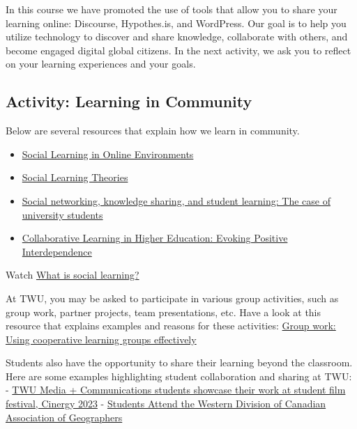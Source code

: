 \documentclass[
]{book}
\providecommand{\tightlist}{%
  \setlength{\itemsep}{0pt}\setlength{\parskip}{0pt}}
\theoremstyle{definition}
\theoremstyle{definition}
\theoremstyle{definition}
\theoremstyle{definition}
\theoremstyle{remark}
\begin{document}
In this course we have promoted the use of tools that allow you to share your learning online: Discourse, Hypothes.is, and WordPress. Our goal is to help you utilize technology to discover and share knowledge, collaborate with others, and become engaged digital global citizens. In the next activity, we ask you to reflect on your learning experiences and your goals.

\hypertarget{activity-learning-in-community}{%
\subsection*{Activity: Learning in Community}\label{activity-learning-in-community}}

\begin{reflect}
Below are several resources that explain how we learn in community.

\begin{itemize}
\tightlist
\item
  \href{https://openpress.usask.ca/humanmooc/chapter/social-learning-in-online-environments/}{Social Learning in Online Environments}
\item
  \href{https://socialsci.libretexts.org/Bookshelves/Education_and_Professional_Development/Teaching_Crowds_-_Learning_and_Social_Media_(Dron_and_Anderson)/02\%3A_Social_Learning_Theories}{Social Learning Theories}
\item
  \href{https://www.sciencedirect.com/science/article/abs/pii/S0360131516300872}{Social networking, knowledge sharing, and student learning: The case of university students}
\item
  \href{https://www.ncbi.nlm.nih.gov/pmc/articles/PMC5132366/}{Collaborative Learning in Higher Education: Evoking Positive Interdependence}
\end{itemize}

Watch \href{https://www.youtube.com/watch?v=AB-_822TRms}{What is social learning?}

At TWU, you may be asked to participate in various group activities, such as group work, partner projects, team presentations, etc. Have a look at this resource that explains examples and reasons for these activities: \href{https://cft.vanderbilt.edu/guides-sub-pages/setting-up-and-facilitating-group-work-using-cooperative-learning-groups-effectively/}{Group work: Using cooperative learning groups effectively}

Students also have the opportunity to share their learning beyond the classroom. Here are some examples highlighting student collaboration and sharing at TWU:
- \href{https://www.twu.ca/news-events/news/twu-media-communications-students-showcase-their-work-student-film-festival}{TWU Media + Communications students showcase their work at student film festival, Cinergy 2023}
- \href{https://www.twu.ca/research/student-research/news}{Students Attend the Western Division of Canadian Association of Geographers}


\end{reflect}
\end{document}
